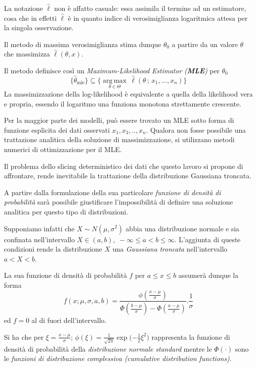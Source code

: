 \documentclass[a4paper]{report}
\begin{document}
La notazione $\hat\ell$ non è affatto casuale: essa assimila il termine ad un estimatore, cosa che in effetti $\hat\ell$ è in quanto indice di verosimiglianza logaritmica attesa per la singola osservazione.

Il metodo di massima verosimiglianza stima dunque $\theta_0$ a partire da un valore $\theta$ che massimizza $\hat\ell(\theta,x)$.

Il metodo definisce così un \textit{Maximum-Likelihood Estimator (\textbf{MLE}) } per $\theta_0$
\[\{ \hat\theta_\mathrm{mle}\} \subseteq \{ \underset{\theta\in\Theta}{\operatorname{arg\,max}}\ \hat\ell(\theta\,;\,x_1,\ldots,x_n) \}\]
La massimizzazione della log-likelihood è equivalente a quella della likelihood vera e propria, essendo il logaritmo una funziona monotona strettamente crescente.

Per la maggior parte dei modelli, può essere trovato un MLE sotto forma di funzione esplicita dei dati osservati $x_1,x_3,..,x_n$.
Qualora non fosse possibile una trattazione analitica della soluzione di massimizzazione, si utilizzano metodi numerici di ottimizzazione per il MLE.

Il problema dello slicing deterministico dei dati che questo lavoro si propone di affrontare, rende inevitabile la trattazione della distribuzione Gaussiana troncata.

A partire dalla formulazione della sua particolare \textit{funzione di densità di probabilità} sarà possibile giustificare l'impossibilità di definire una soluzione analitica per questo tipo di distribuzioni.

Supponiamo infatti che  $X \sim N(\mu, \sigma^{2}) \!$ abbia una distribuzione normale e sia confinata nell'intervallo $ X \in (a,b), \; -\infty \leq a < b \leq \infty $. 
L'aggiunta di queste  condizioni rende la distribuzione $X$ una \textit{Gaussiana troncata} nell'intervallo
$a<X<b$.

La sua funzione di densità di probabilità $f$ per $a\leq x \leq b$ assumerà dunque la forma
\[
f(x;\mu,\sigma,a,b) = \frac{\phi(\frac{x - \mu}{\sigma})}{\Phi(\frac{b - \mu}{\sigma}) - \Phi(\frac{a - \mu}{\sigma}) }{.}\frac{1}{\sigma}
\]
ed $f=0$ al di fuori dell'intervallo.

Si ha che per $	\xi=\frac{x-\mu}{\sigma}$; ${\phi(\xi)=\frac{1}{\sqrt{2 \pi}}\exp{(-\frac{1}{2}\xi^2})} $ rappresenta la funzione di densità di probabilità della \textit{distribuzione normale standard} mentre le ${\Phi(\cdot)}$ sono le \textit{funzioni di distribuzione complessiva (cumulative distribution functions)}.
\end{document}
